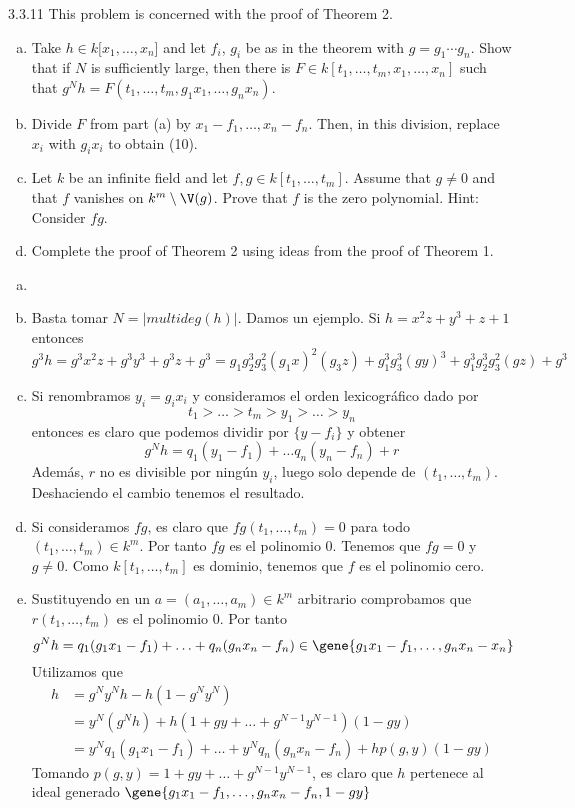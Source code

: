 \documentclass[twoside]{article}
\begin{document}
\newpage

\begin{ejercicio}{3.3.11}
This problem is concerned with the proof of Theorem 2.
\begin{enumerate}[a.]
\item Take $h ∈ k[x_1, \dots , x_n$] and let $f_i$, $g_i$ be as in the theorem with $g = g_1 \cdots g_n$. Show
that if $N$ is sufficiently large, then there is $F ∈ k[t_1, \dots , t_m, x_1, \dots , x_n]$ such that
$g^Nh = F(t_1, \dots , t_m, g_1x_1, \dots , g_nx_n)$.
\item Divide $F$ from part (a) by $x_1 − f_1, \dots , x_n − f_n$. Then, in this division, replace $x_i$ with
$g_ix_i$ to obtain (10).
\item Let $k$ be an infinite field and let $f , g ∈ k[t_1, \dots , t_m]$. Assume that $g \neq 0$ and that $f$
vanishes on $k^m \setminus \V(g)$. Prove that $f$ is the zero polynomial. Hint: Consider $fg$.
\item Complete the proof of Theorem 2 using ideas from the proof of Theorem 1.
\end{enumerate}
\end{ejercicio}
\begin{solucion}
\begin{enumerate}[a.]
\item[]
\item Basta tomar $N = |multideg(h)|$. Damos un ejemplo. Si $h=x^2z+y^3+z+1$ entonces 
$$g^3h = g^3x^2z+g^3y^3+g^3z+g^3 = g_1g_2^3g_3^2(g_1x)^2(g_3z)+g_1^3g_3^3(gy)^3+g_1^3g_2^3g_3^2(gz)+g^3
$$
\item Si renombramos $y_i = g_ix_i$ y consideramos el orden lexicográfico dado por $$t_1 > \dotsc > t_m  > y_1 > \dotsc > y_n$$
entonces es claro que podemos dividir por $\{y-f_i\}$ y obtener
$$
g^Nh = q_1(y_1 - f_1) + \dotsc q_n(y_n-f_n) + r
$$
Además, $r$ no es divisible por ningún $y_i$, luego solo depende de $(t_1,\dotsc,t_m)$. Deshaciendo el cambio tenemos el resultado.
\item Si consideramos $fg$, es claro que $fg(t_1,\dotsc,t_m)=0$ para todo $(t_1,\dotsc,t_m)\in k^m$. Por tanto $fg$ es el polinomio $0$. Tenemos que $fg=0$ y $g\neq 0$. Como $k[t_1,\dotsc,t_m]$ es dominio, tenemos que $f$ es el polinomio cero.
\item Sustituyendo en un $a=(a_1,\dotsc,a_m)\in k^m$ arbitrario comprobamos que $r(t_1,\dotsc,t_m)$ es el polinomio 0. Por tanto
$$g^Nh= q_1(g_1x_1 - f_1) + \dotsc +  q_n(g_nx_n-f_n)  \in \gene{g_1x_1 -f_1,\dotsc,g_nx_n-x_n}
$$
Utilizamos que 
\begin{align*}
h &= g^Ny^N h - h(1-g^Ny^N)\\
&= y^N(g^Nh)+h(1+gy+\dotsc+g^{N-1}y^{N-1})(1-gy)\\
&=y^Nq_1(g_1x_1 - f_1) + \dotsc + y^Nq_n(g_nx_n-f_n) + hp(g,y)(1-gy)
\end{align*}
Tomando $p(g,y)=1+gy+\dotsc+g^{N-1}y^{N-1}$, es claro que $h$ pertenece al ideal generado $\gene{g_1x_1-f_1,\dotsc,g_nx_n-f_n,1-gy}$
\end{enumerate}
\end{solucion}
\end{document}
